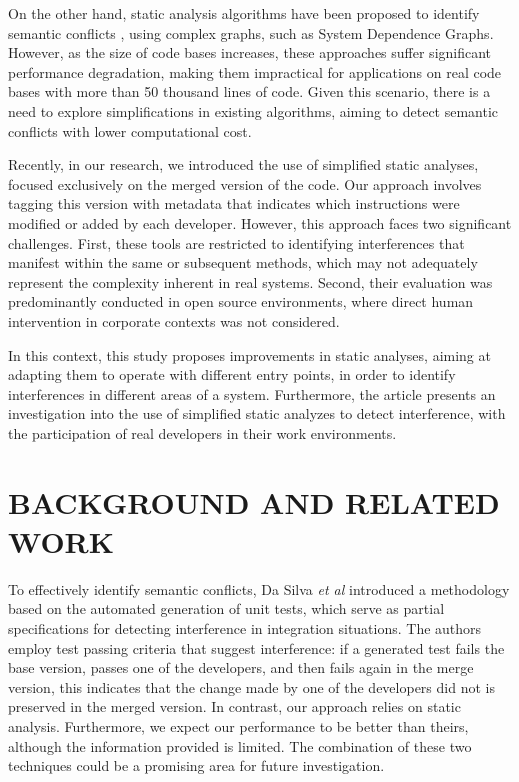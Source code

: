 \documentclass[sigconf,review]{acmart}
\begin{document}
On the other hand, static analysis algorithms have been proposed to identify semantic conflicts \cite{barros2017using, binkley1995program, Horwitz1989IntegratingNV}, using complex graphs, such as System Dependence Graphs. However, as the size of code bases increases, these approaches suffer significant performance degradation, making them impractical for applications on real code bases with more than 50 thousand lines of code. Given this scenario, there is a need to explore simplifications in existing algorithms, aiming to detect semantic conflicts with lower computational cost.

Recently, in our research, we introduced the use of simplified \cite{galileu} static analyses, focused exclusively on the merged version of the code. Our approach involves tagging this version with metadata that indicates which instructions were modified or added by each developer. However, this approach faces two significant challenges. First, these tools are restricted to identifying interferences that manifest within the same or subsequent methods, which may not adequately represent the complexity inherent in real systems. Second, their evaluation was predominantly conducted in open source environments, where direct human intervention in corporate contexts was not considered.

In this context, this study proposes improvements in static analyses, aiming at adapting them to operate with different entry points, in order to identify interferences in different areas of a system. Furthermore, the article presents an investigation into the use of simplified static analyzes to detect interference, with the participation of real developers in their work environments.

\section{BACKGROUND AND RELATED WORK}

To effectively identify semantic conflicts, Da Silva \emph{et al} \cite{silva2022detecting} introduced a methodology based on the automated generation of unit tests, which serve as partial specifications for detecting interference in integration situations. The authors employ test passing criteria that suggest interference: if a generated test fails the base version, passes one of the developers, and then fails again in the merge version, this indicates that the change made by one of the developers did not is preserved in the merged version. In contrast, our approach relies on static analysis. Furthermore, we expect our performance to be better than theirs, although the information provided is limited. The combination of these two techniques could be a promising area for future investigation.
\end{document}
